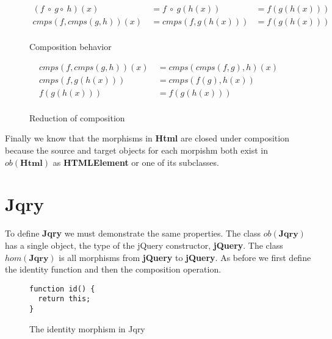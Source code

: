 \documentclass[preprint]{sigplanconf}
\begin{document}
\begin{figure}[h!]
\begin{displaymath}
\begin{align*}
(f\ \circ\ g \circ\ h)(x)\ &= f\ \circ\ g(h(x)) &= f(g(h(x)))\\
cmps(f,cmps(g,h))(x)\ &= cmps(f, g(h(x))) &= f(g(h(x)))\\
\end{align*}
\end{displaymath}
\nocaptionrule \caption{Composition behavior}
\end{figure}

\begin{figure}[h!]
\begin{displaymath}
\begin{align*}
cmps(f,cmps(g,h))(x)\ &= cmps(cmps(f,g),h)(x) \\
cmps(f,g(h(x)))\ &= cmps(f(g),h(x)) \\
f(g(h(x)))\ &= f(g(h(x)))\\
\end{align*}
\end{displaymath}
\nocaptionrule \caption{Reduction of composition}
\end{figure}

Finally we know that the morphisms in \textbf{Html} are closed under composition because the source and target objects for each morpishm both exist in \begin{math}ob(\mathbf{Html})\end{math} as \textbf{HTMLElement} or one of its subclasses.

\section{Jqry}

To define \textbf{Jqry} we must demonstrate the same properties. The class \begin{math}ob(\mathbf{Jqry})\end{math} has a single object, the type of the jQuery constructor, \textbf{jQuery}. The class \begin{math}hom(\mathbf{Jqry})\end{math} is all morphisms from \textbf{jQuery} to \textbf{jQuery}. As before we first define the identity function and then the composition operation.

\begin{figure}[h!]
\begin{verbatim}
function id() {
  return this;
}
\end{verbatim}
\nocaptionrule \caption{The identity morphism in Jqry}
\end{figure}
\end{document}
